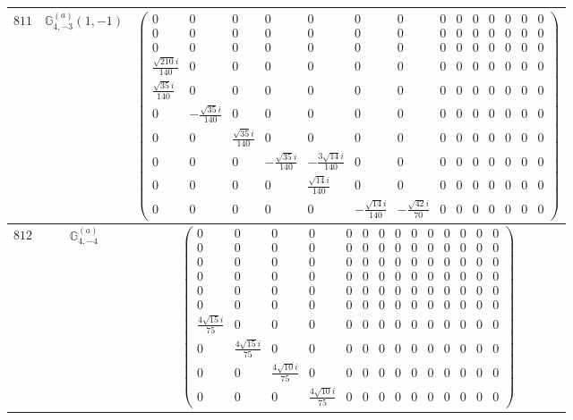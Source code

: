 \documentclass[fleqn,8pt,landscape]{jsarticle}
\begin{document}
\begin{center}
\begin{longtable}{ccc}
$ 811 $ & $ \mathbb{G}_{4,-3}^{(a)}(1,-1) $ & $ \begin{pmatrix} 0 & 0 & 0 & 0 & 0 & 0 & 0 & 0 & 0 & 0 & 0 & 0 & 0 & 0 \\ 0 & 0 & 0 & 0 & 0 & 0 & 0 & 0 & 0 & 0 & 0 & 0 & 0 & 0 \\ 0 & 0 & 0 & 0 & 0 & 0 & 0 & 0 & 0 & 0 & 0 & 0 & 0 & 0 \\ \frac{\sqrt{210} i}{140} & 0 & 0 & 0 & 0 & 0 & 0 & 0 & 0 & 0 & 0 & 0 & 0 & 0 \\ \frac{\sqrt{35} i}{140} & 0 & 0 & 0 & 0 & 0 & 0 & 0 & 0 & 0 & 0 & 0 & 0 & 0 \\ 0 & - \frac{\sqrt{35} i}{140} & 0 & 0 & 0 & 0 & 0 & 0 & 0 & 0 & 0 & 0 & 0 & 0 \\ 0 & 0 & \frac{\sqrt{35} i}{140} & 0 & 0 & 0 & 0 & 0 & 0 & 0 & 0 & 0 & 0 & 0 \\ 0 & 0 & 0 & - \frac{\sqrt{35} i}{140} & - \frac{3 \sqrt{14} i}{140} & 0 & 0 & 0 & 0 & 0 & 0 & 0 & 0 & 0 \\ 0 & 0 & 0 & 0 & \frac{\sqrt{14} i}{140} & 0 & 0 & 0 & 0 & 0 & 0 & 0 & 0 & 0 \\ 0 & 0 & 0 & 0 & 0 & - \frac{\sqrt{14} i}{140} & - \frac{\sqrt{42} i}{70} & 0 & 0 & 0 & 0 & 0 & 0 & 0 \end{pmatrix} $ \\ \hline
$ 812 $ & $ \mathbb{G}_{4,-4}^{(a)} $ & $ \begin{pmatrix} 0 & 0 & 0 & 0 & 0 & 0 & 0 & 0 & 0 & 0 & 0 & 0 & 0 & 0 \\ 0 & 0 & 0 & 0 & 0 & 0 & 0 & 0 & 0 & 0 & 0 & 0 & 0 & 0 \\ 0 & 0 & 0 & 0 & 0 & 0 & 0 & 0 & 0 & 0 & 0 & 0 & 0 & 0 \\ 0 & 0 & 0 & 0 & 0 & 0 & 0 & 0 & 0 & 0 & 0 & 0 & 0 & 0 \\ 0 & 0 & 0 & 0 & 0 & 0 & 0 & 0 & 0 & 0 & 0 & 0 & 0 & 0 \\ 0 & 0 & 0 & 0 & 0 & 0 & 0 & 0 & 0 & 0 & 0 & 0 & 0 & 0 \\ \frac{4 \sqrt{15} i}{75} & 0 & 0 & 0 & 0 & 0 & 0 & 0 & 0 & 0 & 0 & 0 & 0 & 0 \\ 0 & \frac{4 \sqrt{15} i}{75} & 0 & 0 & 0 & 0 & 0 & 0 & 0 & 0 & 0 & 0 & 0 & 0 \\ 0 & 0 & \frac{4 \sqrt{10} i}{75} & 0 & 0 & 0 & 0 & 0 & 0 & 0 & 0 & 0 & 0 & 0 \\ 0 & 0 & 0 & \frac{4 \sqrt{10} i}{75} & 0 & 0 & 0 & 0 & 0 & 0 & 0 & 0 & 0 & 0 \end{pmatrix} $ \\ \hline

\end{longtable}
\end{center}
\end{document}
